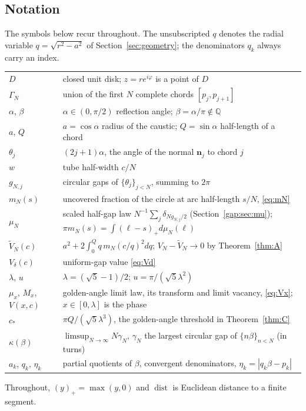 \documentclass[11pt]{amsart}
\theoremstyle{remark}
\newcommand{\Vd}{V_\delta}
\DeclareMathOperator{\dist}{dist}
\begin{document}
\subsection*{Notation}
The symbols below recur throughout. The unsubscripted $q$ denotes the radial variable
$q=\sqrt{r^2-a^2}$ of Section~\ref{sec:geometry}; the denominators $q_k$ always carry an index.
\begin{center}
\small
\begin{tabular}{@{}lp{}@{}}
\toprule
$D$ & closed unit disk; $z=re^{i\varphi}$ is a point of $D$\\
$\Gamma_N$ & union of the first $N$ complete chords $[p_j,p_{j+1}]$\\
$\alpha$, $\beta$ & $\alpha\in(0,\pi/2)$ reflection angle; $\beta=\alpha/\pi\notin\mathbb Q$\\
$a$, $Q$ & $a=\cos\alpha$ radius of the caustic; $Q=\sin\alpha$ half-length of a chord\\
$\theta_j$ & $(2j+1)\alpha$, the angle of the normal $\mathbf n_j$ to chord $j$\\
$w$ & tube half-width $c/N$\\
$g_{N,j}$ & circular gaps of $\{\theta_j\}_{j<N}$, summing to $2\pi$\\
$m_N(s)$ & uncovered fraction of the circle at arc half-length $s/N$, \eqref{eq:mN}\\
$\mu_N$ & scaled half-gap law $N^{-1}\sum_j\delta_{Ng_{N,j}/2}$ (Section~\ref{gap:sec:mu}); $\pi m_N(s)=\int(\ell-s)_+d\mu_N(\ell)$\\
$\widetilde V_N(c)$ & $a^2+2\int_0^Q q\,m_N(c/q)^2dq$; $V_N-\widetilde V_N\to0$ by Theorem~\ref{thm:A}\\
$\Vd(c)$ & uniform-gap value \eqref{eq:Vd}\\
$\lambda$, $u$ & $\lambda=(\sqrt5-1)/2$; $u=\pi/(\sqrt5\lambda^2)$\\
$\mu_x$, $M_x$, $V(x,c)$ & golden-angle limit law, its transform and limit vacancy, \eqref{eq:Vx}; $x\in[0,\lambda]$ is the phase\\
$c_*$ & $\pi Q/(\sqrt5\lambda^3)$, the golden-angle threshold in Theorem~\ref{thm:C}\\
$\kappa(\beta)$ & $\limsup_{N\to\infty}N\gamma_N$, $\gamma_N$ the largest circular gap of $\{n\beta\}_{n<N}$ (in turns)\\
$a_k$, $q_k$, $\eta_k$ & partial quotients of $\beta$, convergent denominators, $\eta_k=|q_k\beta-p_k|$\\
\bottomrule
\end{tabular}
\end{center}
Throughout, $(y)_+=\max(y,0)$ and $\dist$ is Euclidean distance to a finite segment.
\end{document}

